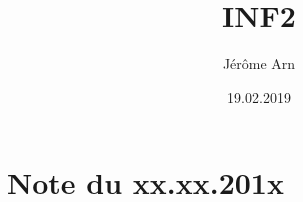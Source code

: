 \documentclass{article}
\title{INF2}
\author{Jérôme Arn}
\date{19.02.2019}
\begin{document}
\maketitle
\newpage

\tableofcontents
\newpage

\section{Note du xx.xx.201x}
\end{document}
